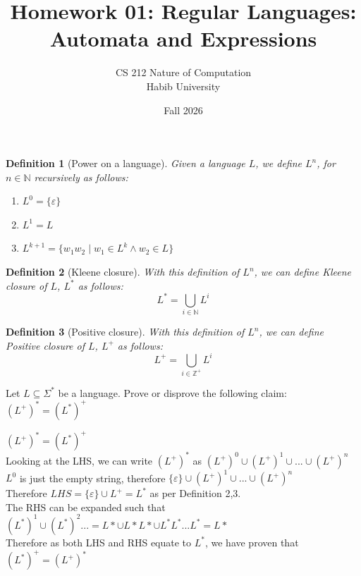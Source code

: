 \documentclass[a4paper]{exam}
\title{Homework 01: Regular Languages: Automata and Expressions}
\author{CS 212 Nature of Computation\\Habib University\\
}
\date{Fall 2026}
\newtheorem{definition}{Definition}
\begin{document}
\maketitle


\begin{questions}
    \question[10]
    \begin{definition}[Power on a language]
        Given a language $L$, we define $L^n$, for $n \in \mathbb{N}$ recursively as follows:
        \begin{enumerate}
            \item $L^0 = \{\varepsilon\}$ 
            \item $L^1 = L$
            \item $L^{k+1} = \{w_1w_2\mid w_1 \in L^k \land w_2 \in L\}$
        \end{enumerate}
    \end{definition}
    \begin{definition}[Kleene closure]
        With this definition of $L^n$, we can define Kleene closure of $L$, $L^*$ as follows:
        $$L^*=\bigcup_{i \in \mathbb{N}} L^i$$
    \end{definition}
    \begin{definition}[Positive closure]
        With this definition of $L^n$, we can define Positive closure of $L$, $L^+$ as follows:
        $$L^+=\bigcup_{i \in \mathbb{Z}^+} L^i$$
    \end{definition}
    
    Let $L \subseteq \Sigma^*$ be a language. Prove or disprove the following claim:
    $(L^+)^*=(L^*)^+$
    
    \begin{solution}
      $(L^+)^* = (L^*)^+$ \\ 
      Looking at the LHS, we can write $(L^+)^*$ as $(L^+)^0 \cup (L^+)^1 \cup ... \cup (L^+)^n$ \\ 
      $L^0$ is just the empty string, therefore $\{\varepsilon \} \cup (L^+)^1 \cup ... \cup (L^+)^n$ \\
      Therefore $LHS =  \{\varepsilon\} \cup L^+ = L^*$ as per Definition 2,3. \\
      The RHS can be expanded such that $(L^*)^1 \cup (L^*)^2 ... = L* \cup L*L* \cup L^*L^*...L^* = L*$ \\ 
      Therefore as both LHS and RHS equate to $L^*$, we have proven that $(L^*)^+ = (L^+)^*$ \\
    \end{solution}
    

\end{questions}
\end{document}

